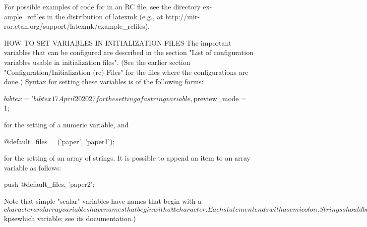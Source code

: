         For possible examples of code for in an RC file, see the directory ex-
       ample_rcfiles  in  the  distribution  of  latexmk (e.g., at http://mir-
       ror.ctan.org/support/latexmk/example_rcfiles).


HOW TO SET VARIABLES IN INITIALIZATION FILES
       The important variables that can be configured  are  described  in  the
       section  "List  of  configuration  variables  usable  in initialization
       files".  (See the earlier  section  "Configuration/Initialization  (rc)
       Files"  for  the  files where the configurations are done.)  Syntax for
       setting these variables is of the following forms:

                           $bibtex = 'bibtex %




                                 17 April 2020                              27








       for the setting of a string variable,

                           $preview_mode = 1;

       for the setting of a numeric variable, and

                           @default_files = ('paper', 'paper1');

       for the setting of an array of strings.  It is possible  to  append  an
       item to an array variable as follows:

                           push @default_files, 'paper2';

       Note  that  simple  "scalar"  variables  have names that begin with a $
       character and array variables have names that begin with a @ character.
       Each statement ends with a semicolon.

       Strings  should  be  enclosed  in single quotes.  (You could use double
       quotes, as in many programming languages.  But then the  Perl  program-
       ming  language  brings  into  play some special rules for interpolating
       variables into strings.  People not fluent in Perl will want  to  avoid
       these complications.)

       You  can do much more complicated things, but for this you will need to
       consult a manual for the Perl programming language.




FORMAT OF COMMAND SPECIFICATIONS
       Some of the variables set the commands that latexmk uses  for  carrying
       out  its  work, for example to generate a .dvi file from a .tex file or
       to view a postscript file.  This section describes some important  fea-
       tures of how the commands are specified.  (Note that some of the possi-
       bilities listed here do not apply to the $kpsewhich variable;  see  its
       documentation.)

